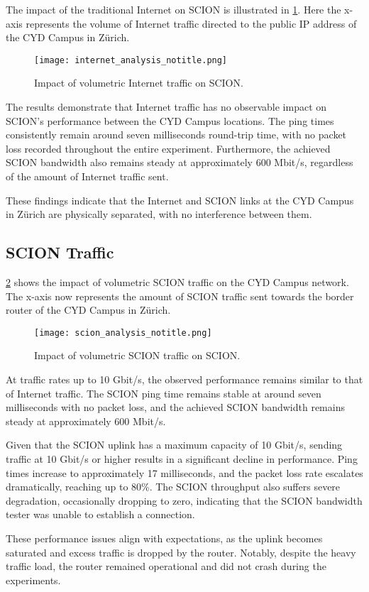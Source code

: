 The impact of the traditional Internet on SCION is illustrated in \cref{fig:internet_traffic}.
Here the x-axis represents the volume of Internet traffic directed to the public IP address of the CYD Campus in Zürich.

\begin{figure}[H]
    \centering
    \texttt{[image: internet\_analysis\_notitle.png]}
    \caption{Impact of volumetric Internet traffic on SCION.}
    \label{fig:internet_traffic}
\end{figure}

The results demonstrate that Internet traffic has no observable impact on SCION's performance between the CYD Campus locations.
The ping times consistently remain around seven milliseconds round-trip time, with no packet loss recorded throughout the entire experiment.
Furthermore, the achieved SCION bandwidth also remains steady at approximately 600 Mbit/s, regardless of the amount of Internet traffic sent.

These findings indicate that the Internet and SCION links at the CYD Campus in Zürich are physically separated, with no interference between them.


\subsection{SCION Traffic}

\cref{fig:scion_traffic} shows the impact of volumetric SCION traffic on the CYD Campus network.
The x-axis now represents the amount of SCION traffic sent towards the border router of the CYD Campus in Zürich.
\newpage
\begin{figure}[H]
    \centering
    \texttt{[image: scion\_analysis\_notitle.png]}
    \caption{Impact of volumetric SCION traffic on SCION.}
    \label{fig:scion_traffic}
\end{figure}

At traffic rates up to 10 Gbit/s, the observed performance remains similar to that of Internet traffic.
The SCION ping time remains stable at around seven milliseconds with no packet loss, and the achieved SCION bandwidth remains steady at approximately 600 Mbit/s.

Given that the SCION uplink has a maximum capacity of 10 Gbit/s, sending traffic at 10 Gbit/s or higher results in a significant decline in performance.
Ping times increase to approximately 17 milliseconds, and the packet loss rate escalates dramatically, reaching up to 80\%.
The SCION throughput also suffers severe degradation, occasionally dropping to zero, indicating that the SCION bandwidth tester was unable to establish a connection.

These performance issues align with expectations, as the uplink becomes saturated and excess traffic is dropped by the router.
Notably, despite the heavy traffic load, the router remained operational and did not crash during the experiments.


